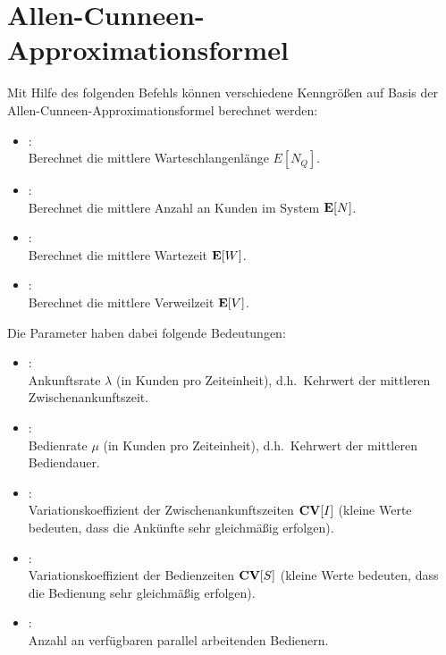 \chapter{Allen-Cunneen-Approximationsformel}

Mit Hilfe des folgenden Befehls können verschiedene Kenngrößen auf Basis der
Allen-Cunneen-Approxi\-ma\-ti\-ons\-for\-mel berechnet werden:

\begin{itemize}

\item
{}:\\
Berechnet die mittlere Warteschlangenlänge $E[N_Q]$. 

\item
{}:\\
Berechnet die mittlere Anzahl an Kunden im System ${\bf E}[N]$.

\item
{}:\\
Berechnet die mittlere Wartezeit ${\bf E}[W]$.

\item
{}:\\
Berechnet die mittlere Verweilzeit ${\bf E}[V]$.
\end{itemize}

Die Parameter haben dabei folgende Bedeutungen:
\begin{itemize}
\item
{}:\\
Ankunftsrate $\lambda$ (in Kunden pro Zeiteinheit), d.h.\ Kehrwert der mittleren Zwischenankunftszeit.
\item
{}:\\
Bedienrate $\mu$ (in Kunden pro Zeiteinheit), d.h.\ Kehrwert der mittleren Bediendauer.
\item
{}:\\
Variationskoeffizient der Zwischenankunftszeiten ${\bf CV}[I]$ (kleine Werte bedeuten, dass die Ankünfte sehr gleichmäßig erfolgen).
\item
{}:\\
Variationskoeffizient der Bedienzeiten ${\bf CV}[S]$ (kleine Werte bedeuten, dass die Bedienung sehr gleichmäßig erfolgen).
\item
{}:\\
Anzahl an verfügbaren parallel arbeitenden Bedienern.
\end{itemize}
